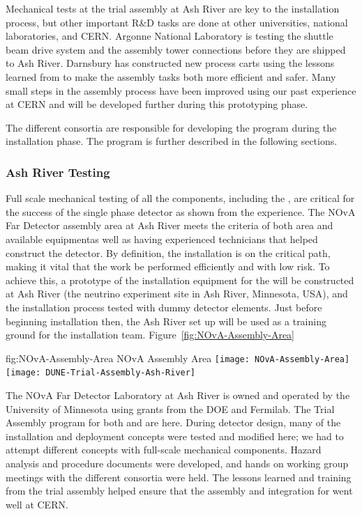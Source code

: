 Mechanical tests at the  trial assembly at Ash River are key to the installation process, but other important R\&D tasks are done at other universities, national laboratories, and CERN. Argonne National Laboratory is testing the  shuttle beam drive system and the  assembly tower connections before they are shipped to Ash River.  
Darnsbury has constructed new process carts using the lessons learned from  to make the assembly tasks both more efficient and safer. 
Many small steps in the assembly process have been improved using our past experience at CERN and will be developed further during this prototyping phase. 

The different consortia are responsible for developing the  program during the installation phase. 
The program is further described in the following  sections. 

\subsubsection{Ash River Testing}

Full scale mechanical testing of all the  components, including the , are critical for the success of the single phase detector as shown from the  experience. 
The NOvA Far Detector assembly area at Ash River meets the criteria of both area and available equipmentas well as having experienced technicians that helped construct the  detector. 
By definition, the installation  is on the critical path, making it vital that the work be performed efficiently and with low risk. 
To achieve this, a prototype of the installation
equipment for the   will be constructed at Ash River (the \nova neutrino experiment  site in Ash River, Minnesota, USA), and the installation process tested with dummy detector
elements.  
Just before beginning
installation then, the Ash River set up will be used as a training ground for the installation team.
Figure~\ref{fig:NOvA-Assembly-Area}
\begin{dunefigure}
{fig:NOvA-Assembly-Area}
{NOvA Assembly Area}                
\texttt{[image: NOvA-Assembly-Area]}
\texttt{[image: DUNE-Trial-Assembly-Ash-River]}
\end{dunefigure}




The NOvA Far Detector Laboratory at Ash River is owned and operated by the University of Minnesota using grants from the DOE and Fermilab. The Trial Assembly program for both  and  are here. During  detector design, many of the installation and deployment concepts were tested and modified here; we had to attempt different concepts with full-scale mechanical components. Hazard analysis and procedure documents were developed, and hands on working group meetings with the different consortia were held.  The lessons learned and training from the trial assembly helped ensure that the assembly and integration for  went well at CERN.

